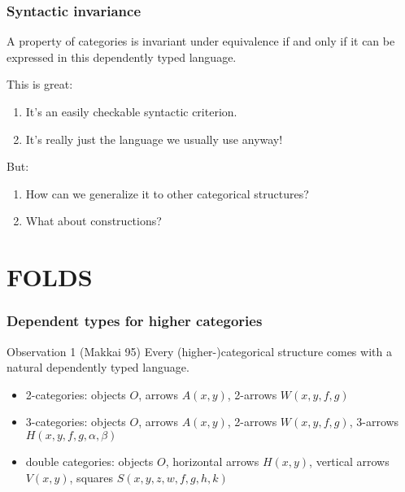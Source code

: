 \documentclass{beamer}
\begin{document}
\begin{frame}
  \frametitle{Syntactic invariance}
  \begin{theorem}
    A \alert<2>{property} of categories is invariant under equivalence \alert<1>{if and only if} it can be expressed in this dependently typed language.
  \end{theorem}
  This is great:
  \begin{enumerate}
  \item It's an easily checkable syntactic criterion.
  \item It's really just the language we usually use anyway!
  \end{enumerate}
  \pause
  But:
  \begin{enumerate}
  \item How can we generalize it to other categorical structures?
  \item What about \alert{constructions}?
  \end{enumerate}
\end{frame}

\section{FOLDS}
\label{sec:folds}

\begin{frame}[t]
  \frametitle{Dependent types for higher categories}
  \begin{block}{Observation 1 (Makkai 95)}
    Every (higher-)categorical structure comes with a natural dependently typed language.
  \end{block}
  \pause
  \begin{itemize}
  \item 2-categories: objects $O$, arrows $A(x,y)$, 2-arrows $W(x,y,f,g)$
    \pause
  \item 3-categories: objects $O$, arrows $A(x,y)$, 2-arrows $W(x,y,f,g)$, 3-arrows $H(x,y,f,g,\alpha,\beta)$
    \pause
  \item double categories: objects $O$, horizontal arrows $H(x,y)$, vertical arrows $V(x,y)$, squares $S(x,y,z,w,f,g,h,k)$
  \end{itemize}
\end{frame}
\end{document}

